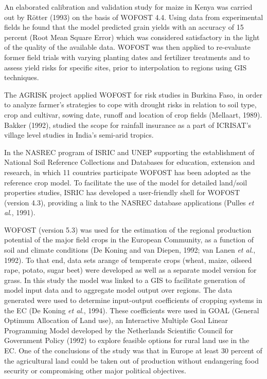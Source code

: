 An elaborated calibration and validation study for maize in Kenya was carried out by
R\"{o}tter (1993) on the basis of WOFOST 4.4. Using data from experimental fields he
found that the model predicted grain yields with an accuracy of 15 percent (Root Mean
Square Error) which was considered satisfactory in the light of the quality of the available
data. WOFOST was then applied to re-evaluate former field trials with varying planting
dates and fertilizer treatments and to assess yield risks for specific sites, prior to
interpolation to regions using GIS techniques.

The AGRISK project applied WOFOST for risk studies in Burkina Faso, in order to
analyze farmer's strategies to cope with drought risks in relation to soil type, crop and
cultivar, sowing date, runoff and location of crop fields (Mellaart, 1989). Bakker (1992),
studied the scope for rainfall insurance as a part of ICRISAT's village level studies in
India's semi-arid tropics.

In the NASREC program of ISRIC and UNEP supporting the establishment of National
Soil Reference Collections and Databases for education, extension and research, in which
11 countries participate WOFOST has been adopted as the reference crop model. To
facilitate the use of the model for detailed land/soil properties studies, ISRIC has
developed a user-friendly shell for WOFOST (version 4.3), providing a link to the
NASREC database applications (Pulles {\it et al}., 1991).

WOFOST (version 5.3) was used for the estimation of the regional production potential of
the major field crops in the European Community, as a function of soil and climate 
conditions (De Koning and van Diepen, 1992; van Lanen {\it et al}., 1992). To that end, 
data sets arange of temperate crops (wheat, maize, oilseed rape, potato, sugar beet) were 
developed as well as a separate model version for grass. In this study the model was linked
to a GIS to facilitate generation of model input data and to aggregate model output over regions.
The data generated were used to determine input-output coefficients of cropping systems
in the EC (De Koning {\it et al}., 1994). These coefficients were used in GOAL (General
Optimum Allocation of Land use), an Interactive Multiple Goal Linear Programming
Model developed by the Netherlands Scientific Council for Government Policy (1992) to
explore feasible options for rural land use in the EC. One of the conclusions of the study
was that in Europe at least 30 percent of the agricultural land could be taken out of
production without endangering food security or compromising other major political
objectives.

